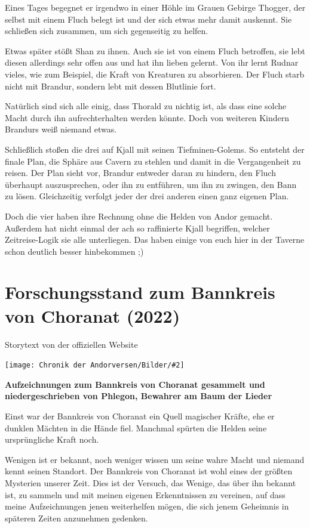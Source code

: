 \documentclass[10pt, a4paper, oneside]{book}
\newcommand{\fillbreak}{\vspace*{\fill}\columnbreak}
\newcommand{\storytext}[1]{%
    \section{#1}%
    \label{Storytext: #1}%
}
\newcommand{\bildmitts}[2][height=0.32\textwidth,width=0.48\textwidth,keepaspectratio]{%
    \begin{center}
        \texttt{[image: Chronik der Andorversen/Bilder/\#2]}
    \end{center}
}
\begin{document}
\begin{multicols}{2}
Eines Tages begegnet er irgendwo in einer Höhle im Grauen Gebirge Thogger, der selbst mit einem Fluch belegt ist und der sich etwas mehr damit auskennt. Sie schließen sich zusammen, um sich gegenseitig zu helfen.

Etwas später stößt Shan zu ihnen. Auch sie ist von einem Fluch betroffen, sie lebt diesen allerdings sehr offen aus und hat ihn lieben gelernt. Von ihr lernt Rudnar vieles, wie zum Beispiel, die Kraft von Kreaturen zu absorbieren. Der Fluch starb nicht mit Brandur, sondern lebt mit dessen Blutlinie fort.

Natürlich sind sich alle einig, dass Thorald zu nichtig ist, als dass eine solche Macht durch ihn aufrechterhalten werden könnte. Doch von weiteren Kindern Brandurs weiß niemand etwas.

Schließlich stoßen die drei auf Kjall mit seinen Tiefminen-Golems. So entsteht der finale Plan, die Sphäre aus Cavern zu stehlen und damit in die Vergangenheit zu reisen. Der Plan sieht vor, Brandur entweder daran zu hindern, den Fluch überhaupt auszusprechen, oder ihn zu entführen, um ihn zu zwingen, den Bann zu lösen. Gleichzeitig verfolgt jeder der drei anderen einen ganz eigenen Plan.

Doch die vier haben ihre Rechnung ohne die Helden von Andor gemacht. Außerdem hat nicht einmal der ach so raffinierte Kjall begriffen, welcher Zeitreise-Logik sie alle unterliegen. Das haben einige von euch hier in der Taverne schon deutlich besser hinbekommen ;)



\fillbreak
\storytext{Forschungsstand zum Bannkreis von Choranat (2022)}

\begin{center}
    Storytext von der offiziellen Website
\end{center}

\bildmitts{Forschungsstand zum Bannkreis von Choranat Bild 1.jpg}

\textbf{Aufzeichnungen zum Bannkreis von Choranat gesammelt und niedergeschrieben von Phlegon, Bewahrer am Baum der Lieder}\bigskip

Einst war der Bannkreis von Choranat ein Quell magischer Kräfte, ehe er dunklen Mächten in die Hände fiel. Manchmal spürten die Helden seine ursprüngliche Kraft noch.\bigskip

Wenigen ist er bekannt, noch weniger wissen um seine wahre Macht und niemand kennt seinen Standort. Der Bannkreis von Choranat ist wohl eines der größten Mysterien unserer Zeit. Dies ist der Versuch, das Wenige, das über ihn bekannt ist, zu sammeln und mit meinen eigenen Erkenntnissen zu vereinen, auf dass meine Aufzeichnungen jenen weiterhelfen mögen, die sich jenem Geheimnis in späteren Zeiten anzunehmen gedenken.


\end{multicols}
\end{document}
